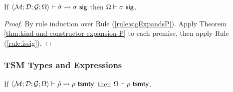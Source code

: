 \begin{theorem}
\label{thm:signature-expansion-P}
If $\langle \mathcal{M}; \mathcal{D}; \mathcal{G}; \Omega \rangle \vdash {\hat\sigma} \leadsto \sigma~\mathsf{sig}$ then $\Omega \vdash \sigma~\mathsf{sig}$.
\end{theorem}
\begin{proof} By rule induction over Rule (\ref{rule:sigExpandsP}). Apply Theorem \ref{thm:kind-and-constructor-expansion-P} to each premise, then apply Rule (\ref{rule:issig}). \end{proof}


\subsubsection{TSM Types and Expressions}
\begin{theorem}
\label{thm:tsm-type-expansion-P}
If $\langle \mathcal{M}; \mathcal{D}; \mathcal{G}; \Omega \rangle \vdash {\hat\rho} \leadsto \rho ~\mathsf{tsmty}$ then $\Omega \vdash \rho~\mathsf{tsmty}$.
\end{theorem}
